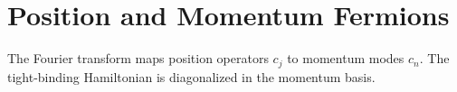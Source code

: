 \chapter{Position and Momentum Fermions}
The Fourier transform maps position operators $c_j$ to momentum modes $c_n$. The tight-binding Hamiltonian is diagonalized in the momentum basis.
